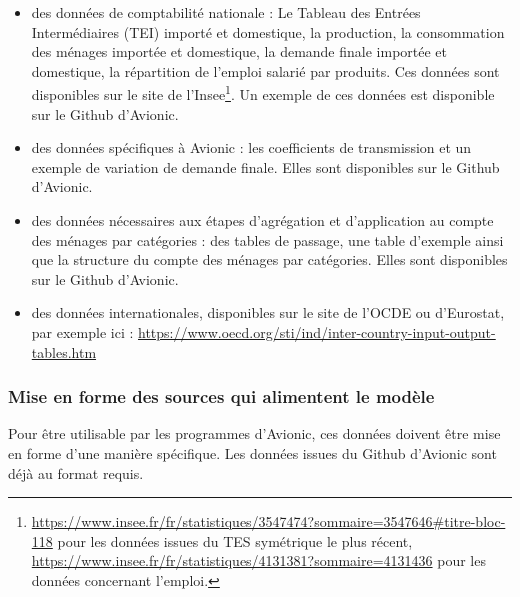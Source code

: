 \documentclass[a4paper,french,11pt]{article}
\begin{document}
\begin{itemize}

\item des donn\'ees de comptabilit\'e nationale : Le Tableau des Entr\'ees Interm\'ediaires (TEI) import\'e et domestique, la production, la consommation des m\'enages import\'ee et domestique, la demande finale import\'ee et domestique, la r\'epartition de l'emploi salari\'e par produits. Ces donn\'ees sont disponibles sur le site de l'Insee\footnote{\url{https://www.insee.fr/fr/statistiques/3547474?sommaire=3547646#titre-bloc-118} pour les donn\'ees issues du TES sym\'etrique le plus r\'ecent, \url{https://www.insee.fr/fr/statistiques/4131381?sommaire=4131436} pour les donn\'ees concernant l'emploi.}. Un exemple de ces donn\'ees est disponible sur le Github d'Avionic.
    
\item des donn\'ees sp\'ecifiques \`a Avionic : les coefficients de transmission et un exemple de variation de demande finale. Elles sont disponibles sur le Github d'Avionic.

\item des donn\'ees n\'ecessaires aux \'etapes d'agr\'egation et d'application au compte des m\'enages par cat\'egories : des tables de passage, une table d'exemple ainsi que la structure du compte des m\'enages par cat\'egories. Elles sont disponibles sur le Github d'Avionic.

\item des donn\'ees internationales, disponibles sur le site de l'OCDE ou d'Eurostat, par exemple ici : \url{https://www.oecd.org/sti/ind/inter-country-input-output-tables.htm}
    
\end{itemize}

\subsubsection{Mise en forme des sources qui alimentent le mod\`ele}

Pour \^etre utilisable par les programmes d'Avionic, ces donn\'ees doivent \^etre mise en forme d'une mani\`ere sp\'ecifique. Les donn\'ees issues du Github d'Avionic sont d\'ej\`a au format requis.
\end{document}
